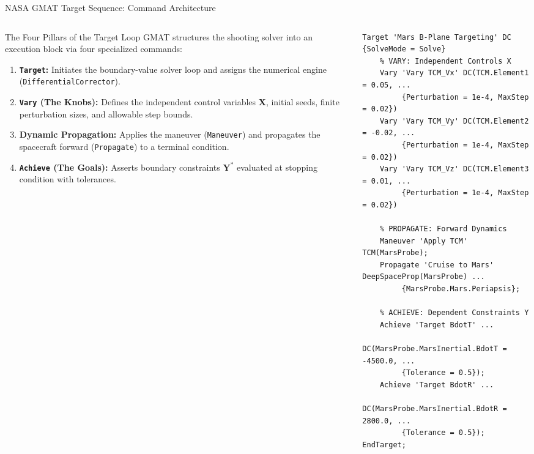 \documentclass[aspectratio=169, 10pt]{beamer}
\begin{document}
\begin{frame}[fragile]{NASA GMAT Target Sequence: Command Architecture}
    \begin{columns}[t]
        \begin{column}{0.48\textwidth}
            \begin{block}{The Four Pillars of the Target Loop}
                \scriptsize
                GMAT structures the shooting solver into an execution block via four specialized commands:
                \begin{enumerate}\setlength{\itemsep}{1.5pt}\setlength{\topsep}{1pt}
                    \item \textbf{\texttt{Target}:} Initiates the boundary-value solver loop and assigns the numerical engine (\texttt{DifferentialCorrector}).
                    \item \textbf{\texttt{Vary} (The Knobs):} Defines the independent control variables $\mathbf{X}$, initial seeds, finite perturbation sizes, and allowable step bounds.
                    \item \textbf{Dynamic Propagation:} Applies the maneuver (\texttt{Maneuver}) and propagates the spacecraft forward (\texttt{Propagate}) to a terminal condition.
                    \item \textbf{\texttt{Achieve} (The Goals):} Asserts boundary constraints $\mathbf{Y}^*$ evaluated at stopping condition with tolerances.
                \end{enumerate}
            \end{block}
        \end{column}

        \begin{column}{0.50\textwidth}
\begin{lstlisting}[style=gmatstyle]
Target 'Mars B-Plane Targeting' DC {SolveMode = Solve}
    % VARY: Independent Controls X
    Vary 'Vary TCM_Vx' DC(TCM.Element1 = 0.05, ...
         {Perturbation = 1e-4, MaxStep = 0.02})
    Vary 'Vary TCM_Vy' DC(TCM.Element2 = -0.02, ...
         {Perturbation = 1e-4, MaxStep = 0.02})
    Vary 'Vary TCM_Vz' DC(TCM.Element3 = 0.01, ...
         {Perturbation = 1e-4, MaxStep = 0.02})

    % PROPAGATE: Forward Dynamics
    Maneuver 'Apply TCM' TCM(MarsProbe);
    Propagate 'Cruise to Mars' DeepSpaceProp(MarsProbe) ...
         {MarsProbe.Mars.Periapsis};

    % ACHIEVE: Dependent Constraints Y
    Achieve 'Target BdotT' ...
         DC(MarsProbe.MarsInertial.BdotT = -4500.0, ...
         {Tolerance = 0.5});
    Achieve 'Target BdotR' ...
         DC(MarsProbe.MarsInertial.BdotR = 2800.0, ...
         {Tolerance = 0.5});
EndTarget;
\end{lstlisting}
        \end{column}
    \end{columns}
\end{frame}
\end{document}
